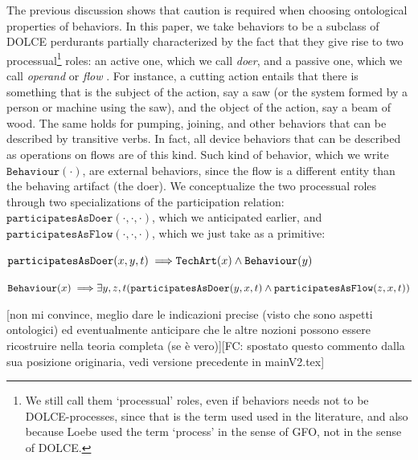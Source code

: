 \documentclass[sw]{iosart2x}
\newcommand{\bflist}{\begin{list}{}{\setlength{\topsep}{2mm}\setlength{\partopsep}{0mm}\setlength{\parsep}{0mm}\setlength{\leftmargin}{9mm}\setlength{\labelwidth}{8mm}}}
\newcommand{\eflist}{\end{list}}
\newcommand{\AxLabel}{\textrm{a}}
\newcounter{cntax}
\newcommand{\myax}[1]{\refstepcounter{cntax}\begin{small}{\bf \AxLabel\thecntax\label{ax:#1}}\end{small}}
\newcommand{\generalStyle}[1]{\texttt{#1}}
\newcommand{\uniRel}[2]{\generalStyle{#1}(#2)}
\newcommand{\triRel}[4]{\generalStyle{#1}(#2,#3,#4)}
\newcommand{\myfi}{\hspace{0.9mm} \Longrightarrow}
\newcommand{\DOLCE}{\textsc{DOLCE}\xspace} %
\newcommand{\TechArt}[1]{\uniRel{TechArt}{#1}}
\newcommand{\BehaviourConcrete}[1]{\uniRel{Behaviour}{#1}}
\newcommand{\participateAsDoer}[3]{\triRel{participatesAsDoer}{#1}{#2}{#3}}
\newcommand{\participateAsFlow}[3]{\triRel{participatesAsFlow}{#1}{#2}{#3}}
\newcommand{\firstTimeKeyWord}[1]{\textit{#1}}
\newcommand{\quotes}[1]{`#1'}
\newcommand{\TODO}[1]{{\color{red} #1}}
\begin{document}
The previous discussion shows that caution is required when choosing ontological properties of behaviors. 
In this paper, we take behaviors to be a subclass of \DOLCE perdurants partially characterized by the fact that they give rise to two processual\footnote{We still call them \quotes{processual} roles, even if behaviors needs not to be \DOLCE-processes, since that is the term used used in the literature, and also because Loebe used the term \quotes{process} in the sense of GFO, not in the sense of \DOLCE \cite{loebeAbstractVsSocial2007}.} roles: an active one, which we call \firstTimeKeyWord{doer}, and a passive one, which we call \firstTimeKeyWord{operand} or \firstTimeKeyWord{flow} \cite{pahl_engineering_2007}. 
For instance, a cutting action entails that there is something that is the subject of the action, say a saw (or the system formed by a person or machine using the saw), and the object of the action, say a beam of wood.
The same holds for pumping, joining, and other behaviors that can be described by transitive verbs. 
In fact, all device behaviors that can be described as operations on flows are of this kind. 
Such kind of behavior, which we write $\BehaviourConcrete{\cdot}$, are external behaviors, since the flow is a different entity than the behaving artifact (the doer).
We conceptualize the two processual roles through two specializations of the participation relation: $\participateAsDoer{\cdot}{\cdot}{\cdot}$, which we anticipated earlier, and $\participateAsFlow{\cdot}{\cdot}{\cdot}$, which we just take as a primitive: 
\bflist
  \item[\myax{participateAsDoerRage}]  $ \participateAsDoer{x}{y}{t} \myfi \TechArt{x} \land \BehaviourConcrete{y} $
  \item[\myax{processualRoles}] $ \BehaviourConcrete{x} \myfi \exists y,z,t(\participateAsDoer{y}{x}{t} \land \participateAsFlow{z}{x}{t}) $ 
\eflist
\TODO{[non mi convince, meglio dare le indicazioni precise (visto che sono aspetti ontologici) ed eventualmente anticipare che le altre nozioni possono essere ricostruire nella teoria completa (se è vero)][FC: spostato questo commento dalla sua posizione originaria, vedi versione precedente in mainV2.tex]}
\end{document}
